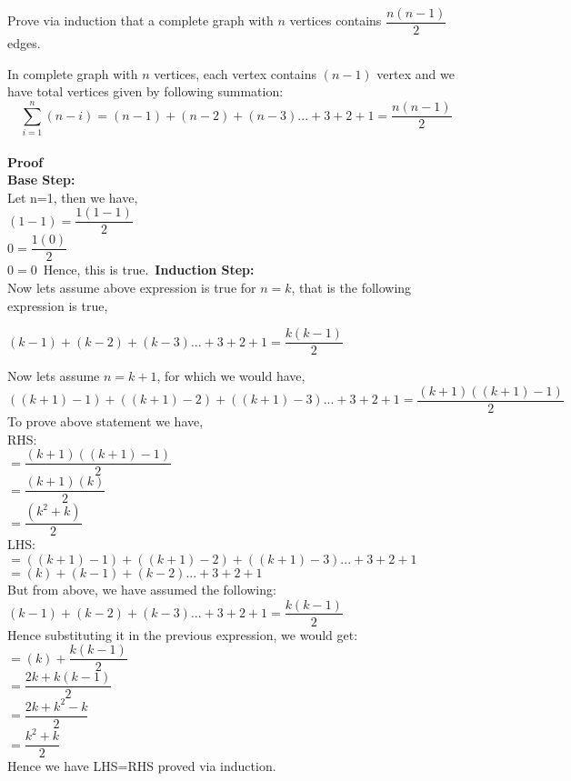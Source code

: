 \documentclass[addpoints]{exam}
\begin{document}
\begin{questions}
\question[5] Prove via induction that a complete graph with $n$ vertices contains $\dfrac{n(n-1)}{2}$ edges.
  \begin{solution}
    In complete graph with $n$ vertices, each vertex contains $(n-1)$ vertex and we have total vertices given by following summation:
	\[
    \sum_{i=1}^{n} (n-i) = (n-1)+(n-2)+(n-3) ... +3+2+1 = \dfrac{n(n-1)}{2}
  \]\\
    \textbf{Proof}\\
    \textbf{Base Step:}\\
    Let n=1, then we have,\\
	$(1-1)=\dfrac{1(1-1)}{2}$\\
	$0=\dfrac{1(0)}{2}$\\
	$0=0$\
  Hence, this is true.\
	\textbf{Induction Step:}\\
	Now lets assume above expression is true for $n=k$, that is the following expression is true,
    \begin{center}
    $(k-1)+(k-2)+(k-3) ... +3+2+1 = \dfrac{k(k-1)}{2}$
    \end{center}
  Now lets assume $n=k+1$, for which we would have,\\
  $((k+1)-1)+((k+1)-2)+((k+1)-3) ... +3+2+1 = \dfrac{(k+1)((k+1)-1)}{2}$\\
  To prove above statement we have,\\
  RHS:\\ 
  $=\dfrac{(k+1)((k+1)-1)}{2}$\\
  $=\dfrac{(k+1)(k)}{2}$\\
  $=\dfrac{(k^{2}+k)}{2}$\\
  
  LHS:\\
    $=((k+1)-1)+((k+1)-2)+((k+1)-3) ... +3+2+1$\\
    $=(k)+(k-1)+(k-2) ... +3+2+1$\\
    But from above, we have assumed the following:\\
    $(k-1)+(k-2)+(k-3) ... +3+2+1 = \dfrac{k(k-1)}{2}$\\
    Hence substituting it in the previous expression, we would get:\\
    $=(k)+\dfrac{k(k-1)}{2}$\\
    $=\dfrac{2k+k(k-1)}{2}$\\
    $=\dfrac{2k+k^{2}-k}{2}$\\
    $=\dfrac{k^{2}+k}{2}$\\
    
    Hence we have LHS=RHS proved via induction.
  \end{solution}
  
\end{questions}
\end{document}
